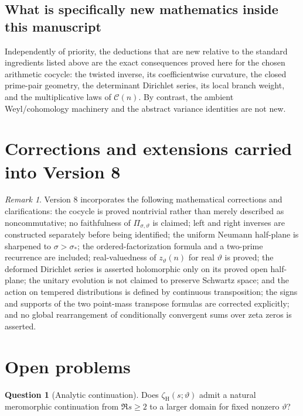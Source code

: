 \documentclass[11pt]{amsart}
\numberwithin{equation}{section}
\theoremstyle{plain}
\theoremstyle{definition}
\newtheorem{question}[theorem]{Question}
\theoremstyle{remark}
\newtheorem{remark}[theorem]{Remark}
\begin{document}
\subsection{What is specifically new mathematics inside this manuscript}
\label{subsec:new_math_v8}
Independently of priority, the deductions that are new relative to the
standard ingredients listed above are the exact consequences proved here for
the chosen arithmetic cocycle: the twisted inverse, its coefficientwise
curvature, the closed prime-pair geometry, the determinant Dirichlet series,
its local branch weight, and the multiplicative laws of
\(\mathcal C(n)\).  By contrast, the ambient Weyl/cohomology machinery and
the abstract variance identities are not new.

\section{Corrections and extensions carried into Version 8}
\label{sec:v2_audit_corrections}

\begin{remark}
\label{rem:v2_audit_corrections}
Version 8 incorporates the following mathematical corrections and
clarifications: the cocycle is proved nontrivial rather than merely described
as noncommutative; no faithfulness of \(\Pi_{\sigma,\vartheta}\) is
claimed; left and right inverses are constructed separately before being
identified; the uniform Neumann half-plane is sharpened to
\(\sigma>\sigma_*\); the ordered-factorization formula and a two-prime
recurrence are included; real-valuedness of \(z_\vartheta(n)\) for real
\(\vartheta\) is proved; the deformed Dirichlet series is asserted
holomorphic only on its proved open half-plane; the unitary evolution is not
claimed to preserve Schwartz space; and the action on tempered distributions
is defined by continuous transposition; the signs and supports of the two point-mass transpose formulas are corrected explicitly; and no global rearrangement of conditionally convergent sums over zeta zeros is asserted.
\end{remark}

\section{Open problems}
\label{sec:open_problems}

\begin{question}[Analytic continuation]
\label{q:analytic_continuation}
Does $\zeta_{\mathrm H}(s;\vartheta)$ admit a natural meromorphic continuation
from $\Re s\ge2$ to a larger domain for fixed nonzero $\vartheta$?
\end{question}
\end{document}
